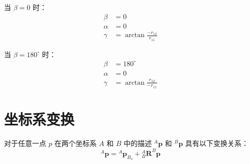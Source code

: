 \documentclass[cn,11pt,chinese,blue,bibstyle=ieeetr]{elegantbook}
\begin{document}
当 $\beta=0$ 时：
\begin{equation}
	\begin{aligned}
		\beta &= 0 \\
		\alpha &= 0 \\
		\gamma &= \arctan\frac{-r_{12}}{r_{11}}
	\end{aligned}
\end{equation}

当 $\beta=180^{\circ}$ 时：
\begin{equation}
	\begin{aligned}
		\beta &= 180^{\circ} \\
		\alpha &= 0 \\
		\gamma &= \arctan\frac{r_{12}}{-r_{11}}
	\end{aligned}
\end{equation}


\section{坐标系变换}\label{transformation_of_coordinate_system}

对于任意一点 $p$ 在两个坐标系 ${A}$ 和 ${B}$ 中的描述 $^A\bm{p}$ 和 $^B\bm{p}$ 具有以下变换关系：
\begin{equation}\label{coordinate_system_transformation_equation}
^A\bm{p} = {^A\bm{p}}_{B_o} + {_B^A\bm{R}}^B\bm{p}
\end{equation}
\end{document}
